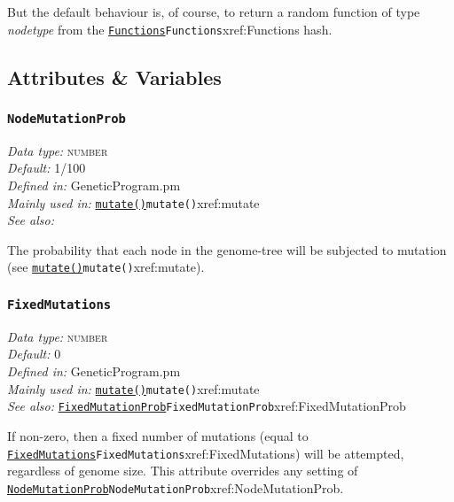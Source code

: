 \documentclass[a4paper]{article}
\begin{document}
But the default behaviour is, of course, to return a random function
of type \textit{nodetype} from the \hyperref[no]{\texttt{Functions}}{\texttt{Functions}}{xref:Functions} hash.


\subsection{Attributes \& Variables}

\subsubsection{\texttt{NodeMutationProb}}\label{xref:NodeMutationProb}
\begin{flushleft}
\textit{Data type:} \textsc{number}\\
\textit{Default:} 1/100\\
\textit{Defined in:} GeneticProgram.pm\\
\textit{Mainly used in:} \hyperref[no]{\texttt{mutate()}}{\texttt{mutate()}}{xref:mutate}\\
\textit{See also:}
\end{flushleft}

The probability that each node in the genome-tree will be subjected to
mutation (see \hyperref[no]{\texttt{mutate()}}{\texttt{mutate()}}{xref:mutate}).

\subsubsection{\texttt{FixedMutations}}\label{xref:FixedMutations}
\begin{flushleft}
\textit{Data type:} \textsc{number}\\
\textit{Default:} 0\\
\textit{Defined in:} GeneticProgram.pm\\
\textit{Mainly used in:} \hyperref[no]{\texttt{mutate()}}{\texttt{mutate()}}{xref:mutate}\\
\textit{See also:} \hyperref[no]{\texttt{FixedMutationProb}}{\texttt{FixedMutationProb}}{xref:FixedMutationProb}
\end{flushleft}

If non-zero, then a fixed number of mutations (equal to
\hyperref[no]{\texttt{FixedMutations}}{\texttt{FixedMutations}}{xref:FixedMutations}) will be attempted, regardless of genome size.
This attribute overrides any setting of \hyperref[no]{\texttt{NodeMutationProb}}{\texttt{NodeMutationProb}}{xref:NodeMutationProb}.
\end{document}
